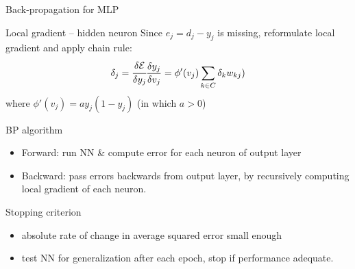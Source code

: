 \documentclass[9pt,t]{beamer}
\begin{document}
\begin{frame}{Back-propagation for MLP}
    \begin{alertblock}{Local gradient -- hidden neuron}
        Since $ e_j = d_j - y_j $ is missing, reformulate local gradient and apply chain rule:
        \[ \delta_j = \cfrac{\delta \mathbf{\mathcal{E}}}{\delta y_j} \frac{\delta y_j}{\delta v_j} = \phi'(v_j) \sum_{k \in C} \delta_k w_{kj}) \]
        where $ \phi'(v_j) = ay_j(1-y_j) $ (in which $ a > 0 $)
    \end{alertblock}
    \begin{alertblock}{BP algorithm}
        \begin{itemize}
            \item Forward: run NN \& compute error for each neuron of output layer
            \item Backward: pass errors backwards from output layer, by recursively computing local gradient of each neuron.
        \end{itemize}
    \end{alertblock}
    \begin{alertblock}{Stopping criterion}
        \begin{itemize}
            \item absolute rate of change in average squared error small enough
            \item test NN for generalization after each epoch, stop if performance adequate.
        \end{itemize}
    \end{alertblock}
\end{frame}
\end{document}

